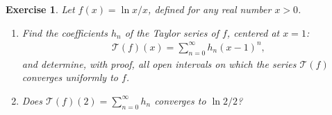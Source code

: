 \documentclass[11pt]{article}
\newtheorem{exercise}{Exercise}[section]
\theoremstyle{definition}
\numberwithin{equation}{subsection}
\begin{document}
\begin{exercise}{\rm *}
Let $\displaystyle f(x) = \ln x / x$, defined for any real number $x > 0$.
\begin{enumerate}[label=(\alph*)]
    \item Find the coefficients $h_n$ of the Taylor series of $f$, centered at $x = 1$:
    \begin{align*}
        \mathcal{T}(f)(x) = \sum^\infty_{n = 0} h_n (x - 1)^n,
    \end{align*}
    and determine, with proof, all open intervals on which the series $\mathcal{T}(f)$ converges uniformly to $f$.
    
    \item Does $\displaystyle \mathcal{T}(f)(2) = \sum^\infty_{n = 0} h_n$ converges to $\ln 2 / 2$?
\end{enumerate}
\end{exercise}
\end{document}
